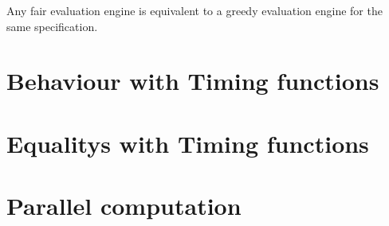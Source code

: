 \begin{theorem}[name = Equivalence of Fair and Greedy Evaluation Engines]\label{theorem:equivalence_greedy_fair_engines}
  Any fair evaluation engine is equivalent to a greedy evaluation engine for the same specification.
\end{theorem}

\section{Behaviour with Timing functions}
\label{sec:behaviours:with_timing}
\section{Equalitys with Timing functions}
\label{sec:behaviours:with_timing}
\section{Parallel computation}

